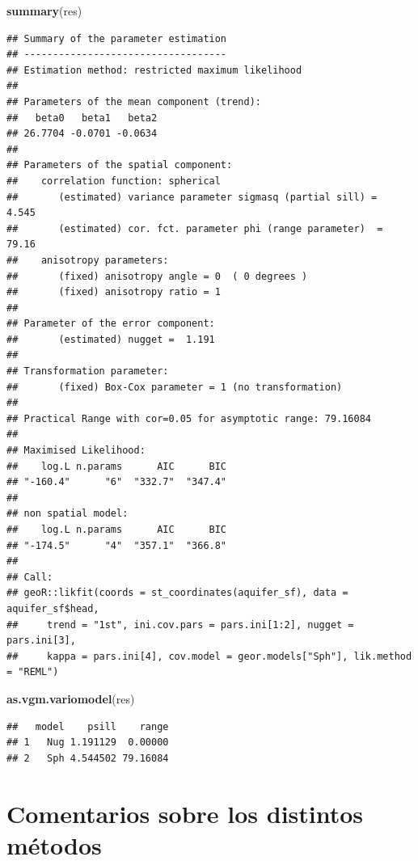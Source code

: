 \documentclass[
]{book}
\newenvironment{Shaded}{\begin{snugshade}}{\end{snugshade}}
\newcommand{\FunctionTok}[1]{\textcolor[rgb]{0.13,0.29,0.53}{\textbf{#1}}}
\newcommand{\NormalTok}[1]{#1}
\theoremstyle{break}
\theoremstyle{definition}
\theoremstyle{definition}
\theoremstyle{definition}
\theoremstyle{definition}
\theoremstyle{remark}
\begin{document}
\begin{Shaded}
\begin{Highlighting}[]
\FunctionTok{summary}\NormalTok{(res)}
\end{Highlighting}
\end{Shaded}

\begin{verbatim}
## Summary of the parameter estimation
## -----------------------------------
## Estimation method: restricted maximum likelihood 
## 
## Parameters of the mean component (trend):
##   beta0   beta1   beta2 
## 26.7704 -0.0701 -0.0634 
## 
## Parameters of the spatial component:
##    correlation function: spherical
##       (estimated) variance parameter sigmasq (partial sill) =  4.545
##       (estimated) cor. fct. parameter phi (range parameter)  =  79.16
##    anisotropy parameters:
##       (fixed) anisotropy angle = 0  ( 0 degrees )
##       (fixed) anisotropy ratio = 1
## 
## Parameter of the error component:
##       (estimated) nugget =  1.191
## 
## Transformation parameter:
##       (fixed) Box-Cox parameter = 1 (no transformation)
## 
## Practical Range with cor=0.05 for asymptotic range: 79.16084
## 
## Maximised Likelihood:
##    log.L n.params      AIC      BIC 
## "-160.4"      "6"  "332.7"  "347.4" 
## 
## non spatial model:
##    log.L n.params      AIC      BIC 
## "-174.5"      "4"  "357.1"  "366.8" 
## 
## Call:
## geoR::likfit(coords = st_coordinates(aquifer_sf), data = aquifer_sf$head, 
##     trend = "1st", ini.cov.pars = pars.ini[1:2], nugget = pars.ini[3], 
##     kappa = pars.ini[4], cov.model = geor.models["Sph"], lik.method = "REML")
\end{verbatim}

\begin{Shaded}
\begin{Highlighting}[]
\FunctionTok{as.vgm.variomodel}\NormalTok{(res)}
\end{Highlighting}
\end{Shaded}

\begin{verbatim}
##   model    psill    range
## 1   Nug 1.191129  0.00000
## 2   Sph 4.544502 79.16084
\end{verbatim}

\section{Comentarios sobre los distintos métodos}\label{comentarios-sobre-los-distintos-muxe9todos}
\end{document}
